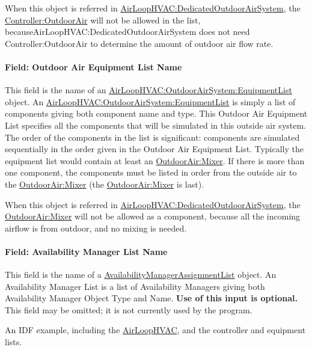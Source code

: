 When this object is referred in \hyperref[airloophvacdedicatedoutdoorairsystem]{AirLoopHVAC:DedicatedOutdoorAirSystem}, the \hyperref[controlleroutdoorair]{Controller:OutdoorAir} will not be allowed in the list, becauseAirLoopHVAC:DedicatedOutdoorAirSystem does not need Controller:OutdoorAir to determine the amount of outdoor air flow rate.

\paragraph{Field: Outdoor Air Equipment List Name}\label{field-outdoor-air-equipment-list-name}

This field is the name of an \hyperref[airloophvacoutdoorairsystemequipmentlist]{AirLoopHVAC:OutdoorAirSystem:EquipmentList} object. An \hyperref[airloophvacoutdoorairsystemequipmentlist]{AirLoopHVAC:OutdoorAirSystem:EquipmentList} is simply a list of components giving both component name and type. This Outdoor Air Equipment List specifies all the components that will be simulated in this outside air system. The order of the components in the list is significant: components are simulated sequentially in the order given in the Outdoor Air Equipment List. Typically the equipment list would contain at least an \hyperref[outdoorairmixer]{OutdoorAir:Mixer}. If there is more than one component, the components must be listed in order from the outside air to the \hyperref[outdoorairmixer]{OutdoorAir:Mixer} (the \hyperref[outdoorairmixer]{OutdoorAir:Mixer} is last).

When this object is referred in \hyperref[airloophvacdedicatedoutdoorairsystem]{AirLoopHVAC:DedicatedOutdoorAirSystem}, the \hyperref[outdoorairmixer]{OutdoorAir:Mixer} will not be allowed as a component, because all the incoming airflow is from outdoor, and no mixing is needed.

\paragraph{Field: Availability Manager List Name}\label{field-availability-manager-list-name-1}

This field is the name of a \hyperref[availabilitymanagerassignmentlist]{AvailabilityManagerAssignmentList} object. An Availability Manager List is a list of Availability Managers giving both Availability Manager Object Type and Name. \textbf{Use of this input is optional.} This field may be omitted; it is not currently used by the program.

An IDF example, including the \hyperref[airloophvac]{AirLoopHVAC}, and the controller and equipment lists.

